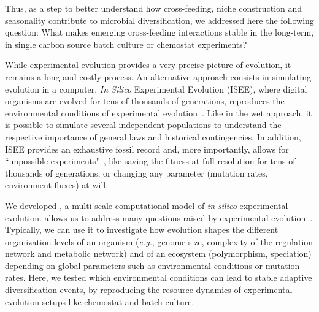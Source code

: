 Thus, as a step to better understand how cross-feeding, niche construction and seasonality contribute to microbial diversification, we addressed here the following question: What makes emerging cross-feeding interactions stable in the long-term, in single carbon source batch culture or chemostat experiments?

While experimental evolution provides a very precise picture of evolution, it remains a long and costly process. An alternative approach consists in simulating evolution in a computer. \textit{In Silico} Experimental Evolution (ISEE), where digital organisms are evolved for tens of thousands of generations, reproduces the environmental conditions of experimental evolution~\citep{hindre-et-al-2012}. Like in the wet approach, it is possible to simulate several independent populations to understand the respective importance of general laws and historical contingencies. In addition, ISEE provides an exhaustive fossil record and, more importantly, allows for ``impossible experiments"~\citep{oneill-2003}, like saving the fitness at full resolution for tens of thousands of generations, or changing any parameter (mutation rates, environment fluxes) at will.

We developed {\EvoEvoSim}, a multi-scale computational model of \textit{in silico} experimental evolution. {\EvoEvoSim} allows us to address many questions raised by experimental evolution~\citep{hindre-et-al-2012}. Typically, we can use it to investigate how evolution shapes the different organization levels of an organism (\textit{e.g.}, genome size, complexity of the regulation network and metabolic network) and of an ecosystem (polymorphism, speciation) depending on global parameters such as environmental conditions or mutation rates. Here, we tested which environmental conditions can lead to stable adaptive diversification events, by reproducing the resource dynamics of experimental evolution setups like chemostat and batch culture.

